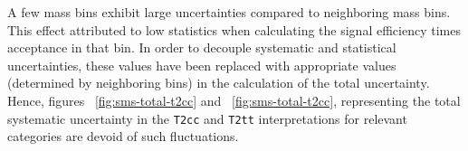 A few mass bins exhibit large uncertainties compared to neighboring 
mass bins.  This effect attributed to low statistics when calculating the signal
efficiency times acceptance in that bin. In order to decouple systematic
and statistical uncertainties, these values have been replaced with appropriate 
values (determined by neighboring bins) in the calculation of the
total uncertainty. Hence, figures ~\ref{fig:sms-total-t2cc} and
~\ref{fig:sms-total-t2cc}, representing the total
systematic uncertainty in the \verb!T2cc! and \verb!T2tt! interpretations
for relevant categories are devoid of such fluctuations.

\begin{figure}[h!]
  \begin{center}
    \\                                                                
\end{center}
\end{figure}
